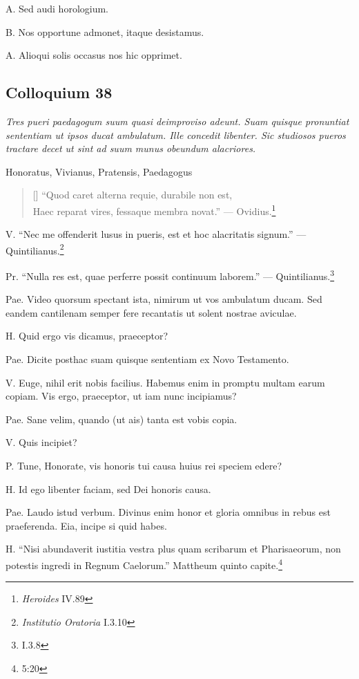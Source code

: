 \documentclass{article}
\begin{document}
A. Sed audi horologium.

B. Nos opportune admonet, itaque desistamus.

A. Alioqui solis occasus nos hic opprimet.

\subsection{Colloquium 38}
\emph{Tres pueri paedagogum suum quasi deimproviso adeunt. Suam quisque pronuntiat sententiam ut ipsos ducat ambulatum. Ille concedit libenter. Sic studiosos pueros tractare decet ut sint ad suum munus obeundum alacriores.}

Honoratus, Vivianus, Pratensis, Paedagogus

\begin{verse}[\versewidth]  ``Quod caret alterna requie, durabile non est,\\ Haec reparat vires, fessaque membra novat.'' --- Ovidius.\footnote{\emph{Heroides} IV.89}\end{verse}

V. ``Nec me offenderit lusus in pueris, est et hoc alacritatis signum.'' --- Quintilianus.\footnote{\emph{Institutio Oratoria} I.3.10}

 
Pr. ``Nulla res est, quae perferre possit continuum laborem.'' --- Quintilianus.\footnote{I.3.8}

Pae. Video quorsum spectant ista, nimirum ut vos ambulatum ducam. Sed eandem cantilenam semper fere recantatis ut solent nostrae aviculae.

H. Quid ergo vis dicamus, praeceptor?

Pae. Dicite posthac suam quisque sententiam ex Novo Testamento.

V. Euge, nihil erit nobis facilius. Habemus enim in promptu multam earum copiam. Vis ergo, praeceptor, ut iam nunc incipiamus?

Pae. Sane velim, quando (ut ais) tanta est vobis copia.

V. Quis incipiet?

P. Tune, Honorate, vis honoris tui causa huius rei speciem edere?

H. Id ego libenter faciam, sed Dei honoris causa.

Pae. Laudo istud verbum. Divinus enim honor et gloria omnibus in rebus est praeferenda. Eia, incipe si quid habes.

H. ``Nisi abundaverit iustitia vestra plus quam scribarum et Pharisaeorum, non potestis ingredi in Regnum Caelorum.'' Mattheum quinto capite.\footnote{5:20}
\end{document}
